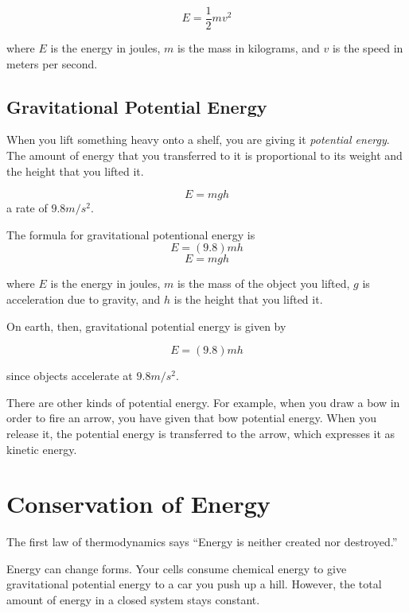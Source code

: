 \begin{mdframed}[style=important, frametitle={Formula for Kinetic Energy}]

\[
E = \frac{1}{2} m v^2
\]

where $E$ is the energy in joules, $m$ is the mass in kilograms, and
$v$ is the speed in meters per second.

\end{mdframed}

\subsection{Gravitational Potential Energy}


When you lift something heavy onto a shelf, you are giving it
\textit{potential energy}. The amount of energy that you transferred
to it is proportional to its weight and the height that you lifted it.

\[
E = mgh
\]
a rate of $9.8 m/s^2$.

\begin{mdframed}[style=important, frametitle={Formula for Gravitational Potential Energy}]
The formula for gravitational potentional energy is
\[
E = (9.8)mh
\]
\[
E = mgh
\]

where $E$ is the energy in joules, $m$ is the mass of the object you
lifted, $g$ is acceleration due to gravity, and $h$ is the height that you lifted it.

On earth, then, gravitational potential energy is given by

\[
E = (9.8)mh
\]

since objects accelerate at $9.8 m/s^2$.

\end{mdframed}


There are other kinds of potential energy. For example, when you draw
a bow in order to fire an arrow, you have given that bow potential energy. When you release it,
the potential energy is transferred to the arrow, which expresses it
as kinetic energy.

\section{Conservation of Energy}

The first law of thermodynamics says ``Energy is neither created nor
destroyed.''

Energy can change forms. Your cells consume chemical energy to give
gravitational potential energy to a car you push up a hill. However, the total amount of
energy in a closed system stays constant.

